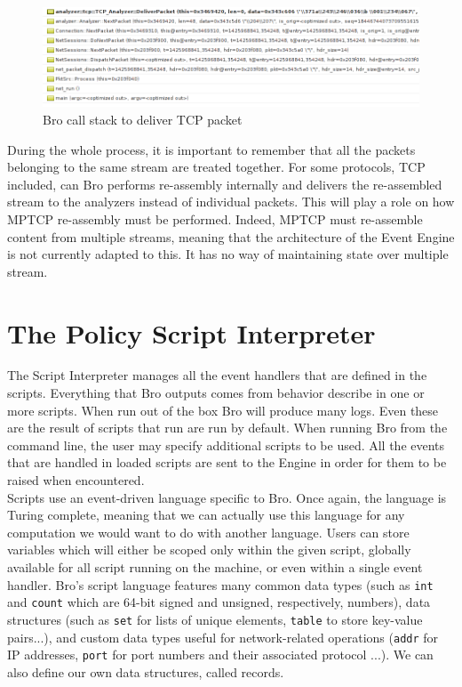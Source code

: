 \begin{figure}[!t]
\centering
\includegraphics[width = \textwidth]{Figures/brodebug.png}
\caption{Bro call stack to deliver TCP packet}
\label{pic:callstack}
\end{figure}

During the whole process, it is important to remember that all the packets belonging to the same stream are treated together. For some protocols, TCP included, can Bro performs re-assembly internally and delivers the re-assembled stream to the analyzers instead of individual packets. This will play a role on how MPTCP re-assembly must be performed. Indeed, MPTCP must re-assemble content from multiple streams, meaning that the architecture of the Event Engine is not currently adapted to this. It has no way of maintaining state over multiple stream.


\section{The Policy Script Interpreter}
The Script Interpreter manages all the event handlers that are defined in the scripts. Everything that Bro outputs comes from behavior describe in one or more scripts. When run out of the box Bro will produce many logs. Even these are the result of scripts that run are run by default. When running Bro from the command line, the user may specify additional scripts to be used. All the events that are handled in loaded scripts are sent to the Engine in order for them to be raised when encountered. \\

Scripts use an event-driven language specific to Bro. Once again, the language is Turing complete, meaning that we can actually use this language for any computation we would want to do with another language. Users can store variables which will either be scoped only within the given script, globally available for all script running on the machine, or even within a single event handler. Bro's script language features many common data types (such as \texttt{int} and \texttt{count}  which are 64-bit signed and unsigned, respectively, numbers), data structures (such as \texttt{set} for lists of unique elements, \texttt{table} to store key-value pairs...), and custom data types useful for network-related operations (\texttt{addr} for IP addresses, \texttt{port} for port numbers and their associated protocol ...). We can also define our own data structures, called records. \\

